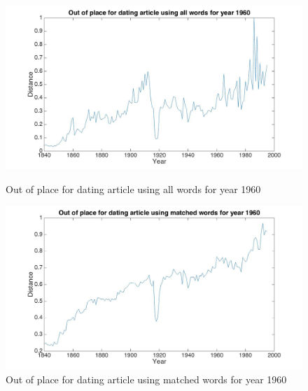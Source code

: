 \begin{figure}[H]
    \begin{minipage}[b]{0.48\linewidth}
        \includegraphics[scale=0.15]{Pictures/date_articles/outofplace/1960_all.jpg}
        \caption{Out of place for dating article using all words for year 1960}
        \label{outofplace_1960_all}
    \end{minipage}\hfill
    \begin{minipage}[b]{0.5\linewidth}
        \includegraphics[scale=0.15]{Pictures/date_articles/outofplace/1960_partial.jpg}
        \caption{Out of place for dating article using matched words for year 1960}
        \label{outofplace_1960_match}
    \end{minipage}\hfill
\end{figure}

